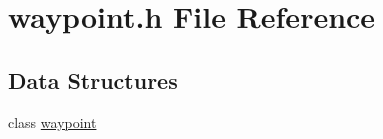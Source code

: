 \hypertarget{a00045}{\section{waypoint.\-h File Reference}
\label{a00045}
}
\subsection*{Data Structures}
\begin{DoxyCompactItemize}
\item 
class \hyperlink{a00016}{waypoint}
\end{DoxyCompactItemize}
